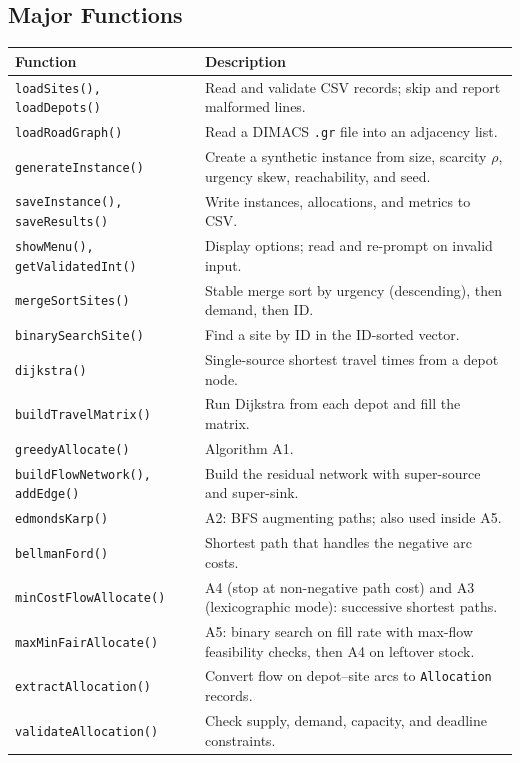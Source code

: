 \documentclass[11pt]{article}
\begin{document}
\subsection{Major Functions}
{\small
\begin{xltabular}{\textwidth}{@{}>{\raggedright\arraybackslash}p{0.38\textwidth} X@{}}
\toprule
\textbf{Function} & \textbf{Description}\\
\midrule
\endhead
\texttt{loadSites(), loadDepots()} & Read and validate CSV records; skip and report malformed lines.\\
\texttt{loadRoadGraph()} & Read a DIMACS \texttt{.gr} file into an adjacency list.\\
\texttt{generateInstance()} & Create a synthetic instance from size, scarcity $\rho$, urgency skew, reachability, and seed.\\
\texttt{saveInstance(), saveResults()} & Write instances, allocations, and metrics to CSV.\\
\texttt{showMenu(), getValidatedInt()} & Display options; read and re-prompt on invalid input.\\
\texttt{mergeSortSites()} & Stable merge sort by urgency (descending), then demand, then ID.\\
\texttt{binarySearchSite()} & Find a site by ID in the ID-sorted vector.\\
\texttt{dijkstra()} & Single-source shortest travel times from a depot node.\\
\texttt{buildTravelMatrix()} & Run Dijkstra from each depot and fill the matrix.\\
\texttt{greedyAllocate()} & Algorithm A1.\\
\texttt{buildFlowNetwork(), addEdge()} & Build the residual network with super-source and super-sink.\\
\texttt{edmondsKarp()} & A2: BFS augmenting paths; also used inside A5.\\
\texttt{bellmanFord()} & Shortest path that handles the negative arc costs.\\
\texttt{minCostFlowAllocate()} & A4 (stop at non-negative path cost) and A3 (lexicographic mode): successive shortest paths.\\
\texttt{maxMinFairAllocate()} & A5: binary search on fill rate with max-flow feasibility checks, then A4 on leftover stock.\\
\texttt{extractAllocation()} & Convert flow on depot--site arcs to \texttt{Allocation} records.\\
\texttt{validateAllocation()} & Check supply, demand, capacity, and deadline constraints.\\

\end{xltabular}}
\end{document}

